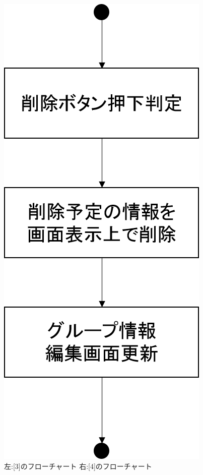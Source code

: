 \begin{figure}[htbp]
\begin{minipage}{0.5\hsize}
\begin{center}
   \includegraphics[width=1.2\linewidth,clip]{./img/edit_group/sub4.png}
  \end{center}
 \end{minipage}
 \caption{左:[3]のフローチャート 右:[4]のフローチャート}\label{fig:editgroupflow0}
\end{figure}

